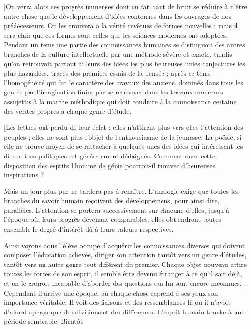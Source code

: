 \documentclass[11pt,a4paper]{article}
\begin{document}
 [On verra alors ces progrès immenses dont on fait
tant de bruit se réduire à n'être autre chose que le développement
d'idées contenues dans les ouvrages de nos prédécesseurs. On les
trouvera à la vérité revêtues de formes 
nouvelles ; mais il sera clair que ces formes sont celles que les
sciences modernes ont adoptées,  Pendant un
tems  une partie des connoissances humaines se distinguoit
des autres  branches de la culture intellectuelle par une
méthode sévère et exacte, tandis qu'on retrouvoit partout ailleurs
 des idées les plus heureuses unies
 conjectures les plus hazardées, traces des premiers essais
de la pensée ; après ce tems l'homogénéité qui fut le caractère des
travaux des anciens, dominés dans tous les genres par l'imagination
finira par se retrouver dans  les travaux modernes
assujettis à la marche méthodique qui doit conduire à la connoissance
certaine des vérités propres à chaque genre d'étude.

[Les lettres ont perdu de leur éclat ; elles n'attirent plus vers elles
l'attention des peuples ; elles ne sont plus l'objet de l'enthousiasme
de la jeunesse. La poësie, si elle ne trouve moyen de se rattacher à
quelques unes des idées qui intéressent les discussions politiques est
généralement dédaignée. Comment dans cette disposition des esprits
l'homme de génie pourroit-il trouver d'heureuses inspirations ?

Mais un jour plus pur ne tardera pas à renaître. L'analogie exige que
toutes les branches du savoir humain reçoivent des développemens, pour
ainsi dire, parallèles. L'attention se portera successivement sur
chacune d'elles, jusqu'à l'époque où, leurs progrès \struck{\ill{}}
devenant comparables,  elles
obtiendront toutes ensemble le degré d'intérêt dû à leurs valeurs
respectives.

Ainsi voyons nous l'élève occupé d'acquérir les connoissances diverses
qui doivent composer l'éducation achevée, diriger son attention tantôt
vers  un genre d'études,
tantôt  vers un autre genre tout différent du premier.
Chaque objet nouveau attire toutes les forces de son esprit, il semble
être devenu étranger à ce qu'il sait déjà, et on le croiroit incapable
d'aborder des questions qui  lui sont encore inconnues,
. Cependant il arrive une époque, où chaque chose
reprend à  ses yeux  son importance
véritable. Il voit des liaisons et des ressemblances là où il n'avoit
d'abord aperçu que des divisions et des différences. L'esprit humain
touche à une période semblable. Bientôt
\end{document}

